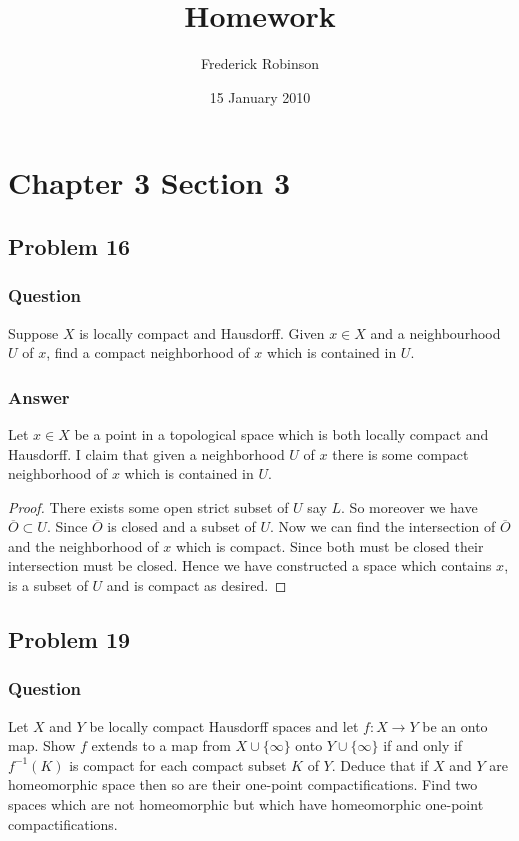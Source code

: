 \documentclass[10pt]{article}
\title{Homework}
\author{Frederick Robinson}
\date{15 January 2010}
\begin{document}

   \maketitle



\section{Chapter 3 Section 3}

\subsection{Problem 16}

\subsubsection{Question}
Suppose $X$ is locally compact and Hausdorff. Given $x \in X$ and a neighbourhood $U$ of $x$, find a compact neighborhood of $x$ which is contained in $U$.
\subsubsection{Answer}
Let $x \in X $ be a point in a topological space which is both locally compact and Hausdorff. I claim that given a neighborhood $U$ of $x$ there is some compact neighborhood of $x$ which is contained in $U$.

\begin{proof}
There exists some open strict subset of $U$ say $L$. So moreover we have $\overline{O} \subset U$. Since $\overline{O}$ is closed and a subset of $U$. Now we can find the intersection of $\overline{O}$ and the neighborhood of $x$ which is compact. Since both must be closed their intersection must be closed. Hence we have constructed a space which contains $x$, is a subset of $U$ and is compact as desired.
\end{proof}


\subsection{Problem 19}

\subsubsection{Question}
Let $X$ and $Y$ be locally compact Hausdorff spaces and let $f:X \to Y$ be an onto map. Show $f$ extends to a map from $X \cup \{\infty\}$ onto $Y \cup \{ \infty\} $ if and only if $f^{-1}(K)$ is compact for each compact subset $K$ of $Y$. Deduce that if $X$ and $Y$ are homeomorphic space then so are their one-point compactifications. Find two spaces which are not homeomorphic but which have homeomorphic one-point compactifications.
\end{document}
